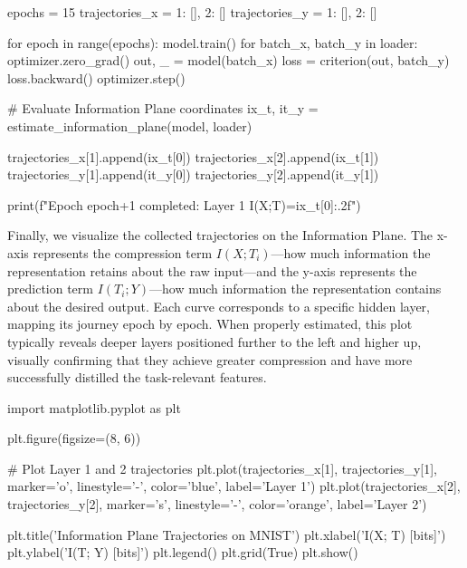 \begin{pycode}
epochs = 15
trajectories_x = {1: [], 2: []}
trajectories_y = {1: [], 2: []}

for epoch in range(epochs):
    model.train()
    for batch_x, batch_y in loader:
        optimizer.zero_grad()
        out, _ = model(batch_x)
        loss = criterion(out, batch_y)
        loss.backward()
        optimizer.step()
        
    # Evaluate Information Plane coordinates
    ix_t, it_y = estimate_information_plane(model, loader)
    
    trajectories_x[1].append(ix_t[0])
    trajectories_x[2].append(ix_t[1])
    trajectories_y[1].append(it_y[0])
    trajectories_y[2].append(it_y[1])
    
    print(f"Epoch {epoch+1} completed: Layer 1 I(X;T)={ix_t[0]:.2f}")
\end{pycode}

Finally, we visualize the collected trajectories on the Information Plane. The x-axis represents the compression term $I(X; T_i)$—how much information the representation retains about the raw input—and the y-axis represents the prediction term $I(T_i; Y)$—how much information the representation contains about the desired output. Each curve corresponds to a specific hidden layer, mapping its journey epoch by epoch. When properly estimated, this plot typically reveals deeper layers positioned further to the left and higher up, visually confirming that they achieve greater compression and have more successfully distilled the task-relevant features.

\begin{pycode}
import matplotlib.pyplot as plt

plt.figure(figsize=(8, 6))

# Plot Layer 1 and 2 trajectories
plt.plot(trajectories_x[1], trajectories_y[1], marker='o', 
         linestyle='-', color='blue', label='Layer 1')
plt.plot(trajectories_x[2], trajectories_y[2], marker='s', 
         linestyle='-', color='orange', label='Layer 2')

plt.title('Information Plane Trajectories on MNIST')
plt.xlabel('I(X; T) [bits]')
plt.ylabel('I(T; Y) [bits]')
plt.legend()
plt.grid(True)
plt.show()
\end{pycode}
